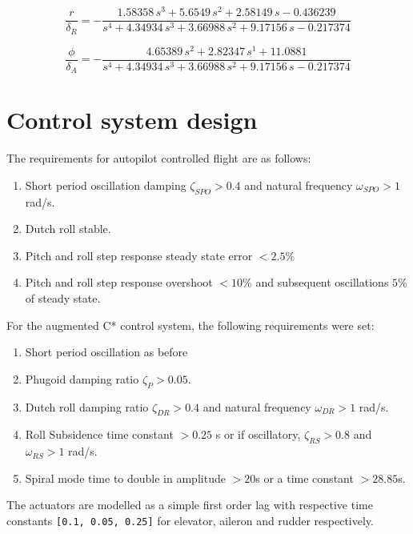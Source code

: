 \documentclass{article}
\begin{document}
\begin{equation}
    \frac{r}{\delta_R} =
    -\frac{1.58358\,s^3+5.6549\,s^2+2.58149\,s-0.436239}{s^4+4.34934\,s^3+3.66988\,s^2+9.17156\,s-0.217374}
    \label{eq:yaw_rud}
\end{equation}

\begin{equation}
    \frac{\phi}{\delta_A} =
    -\frac{4.65389\,s^2+2.82347\,s^1+11.0881}{s^4+4.34934\,s^3+3.66988\,s^2+9.17156\,s-0.217374}
    \label{eq:roll_ail}
\end{equation}


\section{Control system design}

The requirements for autopilot controlled flight are as follows:
\begin{enumerate}
    \renewcommand{\labelenumi}{\alph{enumi})}
    \item Short period oscillation damping $\zeta_{SPO} > 0.4$ and natural frequency $\omega_{SPO} > 1$ rad/s.
    \item Dutch roll stable. \label{req:DR}
    \item Pitch and roll step response steady state error $< 2.5 \%$
    \item Pitch and roll step response overshoot $< 10 \%$ and subsequent oscillations $5 \%$ of steady state.
\end{enumerate}

For the augmented C* control system, the following requirements were set:
\begin{enumerate}
    \renewcommand{\labelenumi}{\roman{enumi})}
    \item Short period oscillation as before
    \item Phugoid damping ratio $\zeta_{P} > 0.05$.
    \item Dutch roll damping ratio $\zeta_{DR} > 0.4$ and natural frequency $\omega_{DR} > 1$ rad/s.
    \item Roll Subsidence time constant $> 0.25$ s or if oscillatory, $\zeta_{RS} > 0.8$ and $\omega_{RS} > 1$ rad/s. \label{req:RS}
    \item Spiral mode time to double in amplitude $>20$s or a time constant $>28.85$s.
\end{enumerate}

The actuators are modelled as a simple first order lag with respective time constants \texttt{[0.1, 0.05, 0.25]} for elevator, aileron and rudder respectively.
\end{document}

